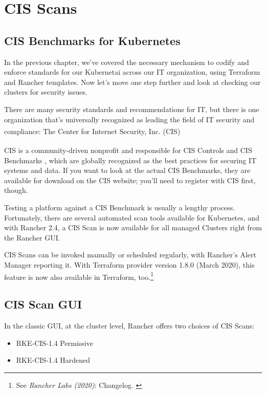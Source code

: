 %
%

\pagebreak
\section{CIS Scans}

\onehalfspacing

\subsection{CIS Benchmarks for Kubernetes}

In the previous chapter, we've covered the necessary mechanism to codify and enforce standards for our Kubernetai across our IT organization, using Terraform and Rancher templates. Now let's move one step further and look at checking our clusters for security issues.

There are many security standards and recommendations for IT, but there is one organization that's universally recognized as leading the field of IT security and compliance: The Center for Internet Security, Inc. (CIS\textsuperscript{\textregistered})

CIS is a community-driven nonprofit and responsible for CIS Controls\textsuperscript{\textregistered} and CIS Benchmarks \texttrademark, which are globally recognized as the best practices for securing IT systems and data. If you want to look at the actual CIS Benchmarks, they are available for download on the CIS website; you'll need to register with CIS first, though.

Testing a platform against a CIS Benchmark is usually a lengthy process. Fortunately, there are several automated scan tools available for Kubernetes, and with Rancher 2.4, a CIS Scan is now available for all managed Clusters right from the Rancher GUI.

CIS Scans can be invoked manually or scheduled regularly, with Rancher's Alert Manager reporting it. With Terraform provider version 1.8.0 (March 2020), this feature is now also available in Terraform, too.\footnote{See \textit{Rancher Labs (2020)}: Changelog. \cite{ChangeLog}}

\subsection{CIS Scan GUI}

In the classic GUI, at the cluster level, Rancher offers two choices of CIS Scans:

\begin{itemize}
\item RKE-CIS-1.4 Permissive
\item RKE-CIS-1.4 Hardened
\end{itemize}

